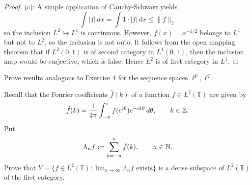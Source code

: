 \begin{proof}
	(c): A simple application of Cauchy-Schwarz yields
	\begin{equation*}
		\int |f| \,dx = \int 1 \cdot |f| \,dx \le \|f\|_2
	\end{equation*}
	so the inclusion $L^2 \hookrightarrow L^1$ is continuous. However, $f(x) = x^{-1/2}$ belongs to $L^1$ but not to $L^2$, so the inclusion is not onto. It follows from the open mapping theorem that if $L^2(0,1)$ is of second category in $L^1(0,1)$, then the inclusion map would be surjective, which is false. Hence $L^2$ is of first category in $L^1$.
\end{proof}

\begin{exercise}[Rudin Ex.\ 2.5]
	Prove results analogous to Exercise 4 for the sequence spaces $\ell^p, \ell^q$.
\end{exercise}

\begin{exercise}[Rudin Ex.\ 2.6]
	Recall that the Fourier coefficients $\hat{f}(k)$ of a function $f \in L^2(\mathbb{T})$ are given by
	\begin{equation*}
		\hat{f}(k) = \frac{1}{2\pi}\int_{-\pi}^\pi f(e^{i\theta}) e^{-ik\theta} \,d\theta, \qquad k \in \mathbb{Z}.
	\end{equation*}
	Put
	\begin{equation*}
		\Lambda_n f := \sum_{k=-n}^n \hat{f}(k), \qquad n \in \mathbb{N}.
	\end{equation*}
	Prove that $Y = \{f \in L^2(\mathbb{T}) : \lim_{n\to\infty} \Lambda_n f \text{ exists}\}$ is a dense subspace of $L^2(\mathbb{T})$ of the first category.
\end{exercise}


